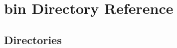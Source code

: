 \section{bin Directory Reference}
\label{dir_2ea30aa2956a8db99dd22aa5e597f384}
\subsection*{Directories}
\begin{DoxyCompactItemize}
\end{DoxyCompactItemize}
